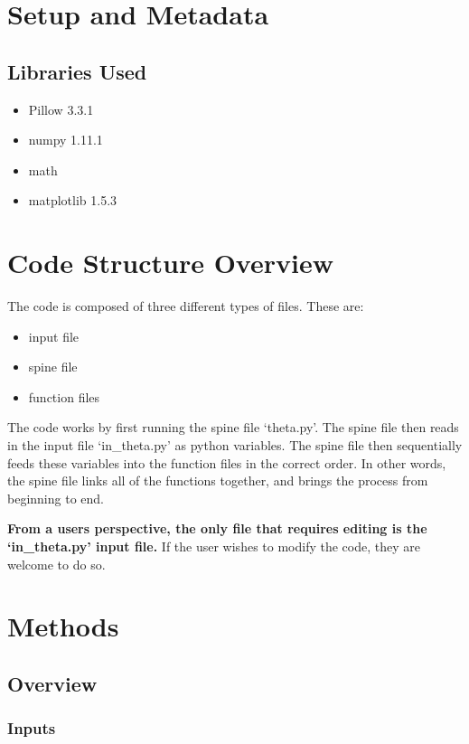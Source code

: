 \documentclass{report}
\begin{document}
\chapter{Setup and Metadata}

\section{Libraries Used}

\begin{itemize}
\item Pillow 3.3.1
\item numpy 1.11.1
\item math 
\item matplotlib 1.5.3
\end{itemize}

\chapter{Code Structure Overview}

The code is composed of three different types of files. These are:
\begin{itemize}
\item input file
\item spine file
\item function files
\end{itemize}

The code works by first running the spine file `theta.py'. The spine file then reads in the input file `in\_theta.py' as python variables. The spine file then sequentially feeds these variables into the function files in the correct order. In other words, the spine file links all of the functions together, and brings the process from beginning to end.

\textbf{From a users perspective, the only file that requires editing is the `in\_theta.py' input file.}  If the user wishes to modify the code, they are welcome to do so. 

\chapter{Methods}

\section{Overview}

\subsection{Inputs}
\end{document}
